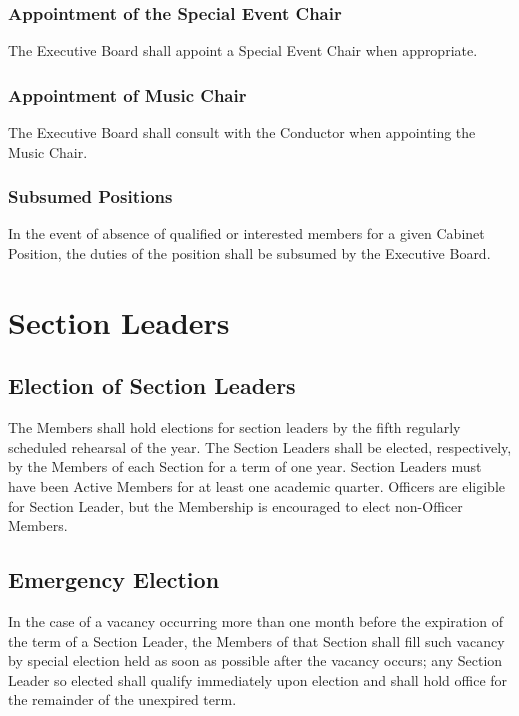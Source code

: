 \documentclass{article}
\begin{document}
\subsubsection{Appointment of the Special Event Chair}

The Executive Board shall appoint a Special Event Chair when appropriate.

\subsubsection{Appointment of Music Chair}

The Executive Board shall consult with the Conductor when appointing
the Music Chair.

\subsubsection{Subsumed Positions}

In the event of absence of qualified or interested members for a given
Cabinet Position, the duties of the position shall be subsumed by
the Executive Board.

\section{Section Leaders}

\subsection{Election of Section Leaders}

The Members shall hold elections for section leaders by the fifth
regularly scheduled rehearsal of the year. The Section Leaders shall
be elected, respectively, by the Members of each Section for a term
of one year. Section Leaders must have been Active Members for at
least one academic quarter. Officers are eligible for Section Leader,
but the Membership is encouraged to elect non-Officer Members.

\subsection{Emergency Election}

In the case of a vacancy occurring more than one month before the
expiration of the term of a Section Leader, the Members of that Section
shall fill such vacancy by special election held as soon as possible
after the vacancy occurs; any Section Leader so elected shall qualify
immediately upon election and shall hold office for the remainder
of the unexpired term.
\end{document}
